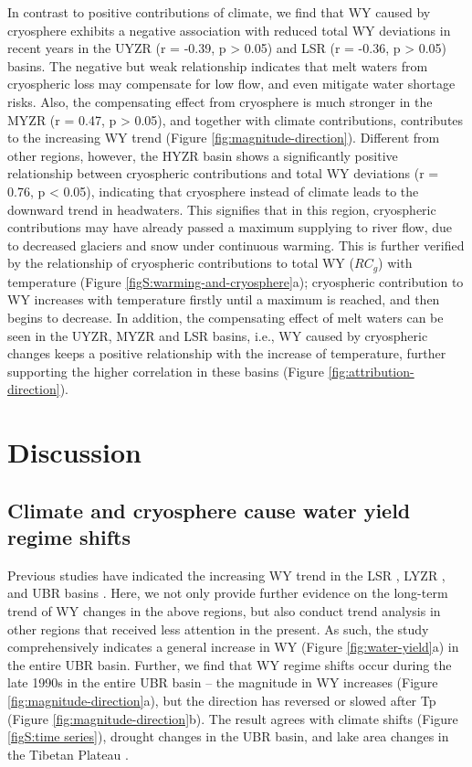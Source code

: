 \documentclass[hess, manuscript]{copernicus}
\begin{document}
In contrast to positive contributions of climate, we find that WY caused by cryosphere exhibits a negative association with reduced total WY deviations in recent years in the UYZR (r = -0.39, p > 0.05) and LSR (r = -0.36, p > 0.05) basins. The negative but weak relationship indicates that melt waters from cryospheric loss may compensate for low flow, and even mitigate water shortage risks. Also, the compensating effect from cryosphere is much stronger in the MYZR (r = 0.47, p > 0.05), and together with climate contributions, contributes to the increasing WY trend (Figure \ref{fig:magnitude-direction}). Different from other regions, however, the HYZR basin shows a significantly positive relationship between cryospheric contributions and total WY deviations (r = 0.76, p < 0.05), indicating that cryosphere instead of climate leads to the downward trend in headwaters. This signifies that in this region, cryospheric contributions may have already passed a maximum supplying to river flow, due to decreased glaciers and snow under continuous warming. This is further verified by the relationship of cryospheric contributions to total WY ($RC_g$) with temperature (Figure \ref{figS:warming-and-cryosphere}a); cryospheric contribution to WY increases with temperature firstly until a maximum is reached, and then begins to decrease. In addition, the compensating effect of melt waters can be seen in the UYZR, MYZR and LSR basins, i.e., WY caused by cryospheric changes keeps a positive relationship with the increase of temperature, further supporting the higher correlation in these basins (Figure \ref{fig:attribution-direction}).

\section{Discussion}
\subsection{Climate and cryosphere cause water yield regime shifts}
Previous studies have indicated the increasing WY trend in the LSR \citep{linhess2020}, LYZR \citep{zhangech2011}, and UBR basins \citep{li2021vegetation}. Here, we not only provide further evidence on the long-term trend of WY changes in the above regions, but also conduct trend analysis in other regions that received less attention in the present. As such, the study comprehensively indicates a general increase in WY (Figure \ref{fig:water-yield}a) in the entire UBR basin. Further, we find that WY regime shifts occur during the late 1990s in the entire UBR basin -- the magnitude in WY increases (Figure \ref{fig:magnitude-direction}a), but the direction has reversed or slowed after Tp (Figure \ref{fig:magnitude-direction}b). The result agrees with climate shifts (Figure \ref{figS:time series}), drought changes \citep{li2019spatiotemporal} in the UBR basin, and lake area changes in the Tibetan Plateau \citep{zhang2017}.
\end{document}
